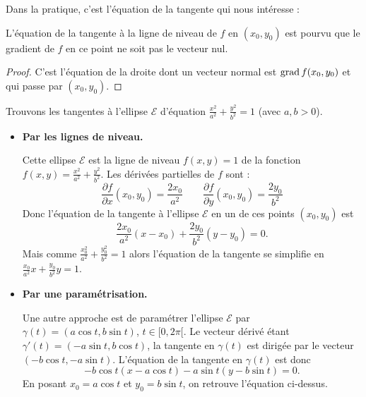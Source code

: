 \documentclass[11pt, class=report,crop=false]{standalone}
\begin{document}
Dans la pratique, c'est l'équation de la tangente qui nous intéresse :

\begin{proposition}
L{'}équation de la tangente à la ligne de niveau de $f$ en $(x_0,y_0)$ est 
pourvu que le gradient de $f$ en ce point ne soit pas le vecteur nul.
\end{proposition}

\begin{proof}
C'est l'équation de la droite dont un vecteur normal est $\operatorname{grad} f(x_0,y_0)$ et qui passe par $(x_0,y_0)$.
\end{proof}


\begin{exemple}
Trouvons les tangentes à l'ellipse $\mathcal{E}$ d'équation $\frac{x^2}{a^2}+\frac{y^2}{b^2} = 1$ (avec $a,b>0$).



\begin{itemize}
  \item \textbf{Par les lignes de niveau.} 
  
  Cette ellipse $\mathcal{E}$ est la ligne de niveau $f(x,y)=1$ de la fonction
  $f(x,y) = \frac{x^2}{a^2}+\frac{y^2}{b^2}$. 
  Les dérivées partielles de $f$ sont :
  $$\frac{\partial f}{\partial x}(x_0,y_0) = \frac{2x_0}{a^2} \qquad
\frac{\partial f}{\partial y}(x_0,y_0) = \frac{2y_0}{b^2}$$
  Donc l'équation de la tangente à l'ellipse $\mathcal{E}$ en un de ces points $(x_0,y_0)$ est
  $$\frac{2x_0}{a^2}(x-x_0)+\frac{2y_0}{b^2}(y-y_0)=0.$$
  Mais comme $\frac{x_0^2}{a^2}+\frac{y_0^2}{b^2} = 1$ alors l'équation de la tangente se simplifie en $\displaystyle \frac{x_0}{a^2}x + \frac{y_0}{b^2} y = 1$.
  
  \item \textbf{Par une paramétrisation.}
  
  Une autre approche est de paramétrer l'ellipse $\mathcal{E}$ par 
  $\gamma(t) = (a \cos t, b \sin t)$, $t \in [0,2\pi[$.
  Le vecteur dérivé étant $\gamma'(t) = (-a \sin t, b \cos t)$, la tangente
  en $\gamma(t)$ est dirigée par le vecteur $(-b \cos t,-a \sin t)$.
  L'équation de la tangente en $\gamma(t)$ est donc
  $$-b \cos t (x - a \cos t) -a\sin t (y - b\sin t) = 0.$$
  En posant $x_0 = a \cos t$ et $y_0 = b \sin t$, on retrouve l'équation ci-dessus.

\end{itemize}
\end{exemple}
\end{document}
